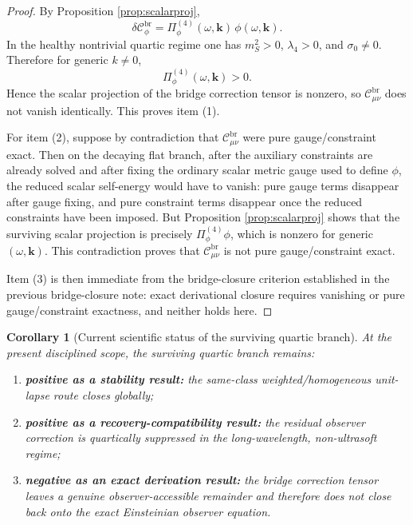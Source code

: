 \documentclass[11pt]{article}
\newtheorem{corollary}{Corollary}
\begin{document}
\begin{proof}
By Proposition \ref{prop:scalarproj},
\[
\delta\mathcal C_{\phi}^{\mathrm{br}}
=
\Pi_\phi^{(4)}(\omega,\mathbf{k})\,\phi(\omega,\mathbf{k}).
\]
In the healthy nontrivial quartic regime one has \(m_S^2>0\), \(\lambda_4>0\), and \(\sigma_0\neq 0\). Therefore for generic \(k\neq 0\),
\[
\Pi_\phi^{(4)}(\omega,\mathbf{k})>0.
\]
Hence the scalar projection of the bridge correction tensor is nonzero, so \(\mathcal C_{\mu\nu}^{\mathrm{br}}\) does not vanish identically. This proves item (1).

For item (2), suppose by contradiction that \(\mathcal C_{\mu\nu}^{\mathrm{br}}\) were pure gauge/constraint exact. Then on the decaying flat branch, after the auxiliary constraints are already solved and after fixing the ordinary scalar metric gauge used to define \(\phi\), the reduced scalar self-energy would have to vanish: pure gauge terms disappear after gauge fixing, and pure constraint terms disappear once the reduced constraints have been imposed. But Proposition \ref{prop:scalarproj} shows that the surviving scalar projection is precisely \(\Pi_\phi^{(4)}\phi\), which is nonzero for generic \((\omega,\mathbf{k})\). This contradiction proves that \(\mathcal C_{\mu\nu}^{\mathrm{br}}\) is not pure gauge/constraint exact.

Item (3) is then immediate from the bridge-closure criterion established in the previous bridge-closure note: exact derivational closure requires vanishing or pure gauge/constraint exactness, and neither holds here.
\end{proof}

\begin{corollary}[Current scientific status of the surviving quartic branch]
\label{cor:status}
At the present disciplined scope, the surviving quartic branch remains:
\begin{enumerate}
    \item \textbf{positive as a stability result:} the same-class weighted/homogeneous unit-lapse route closes globally;
    \item \textbf{positive as a recovery-compatibility result:} the residual observer correction is quartically suppressed in the long-wavelength, non-ultrasoft regime;
    \item \textbf{negative as an exact derivation result:} the bridge correction tensor leaves a genuine observer-accessible remainder and therefore does not close back onto the exact Einsteinian observer equation.
\end{enumerate}
\end{corollary}
\end{document}
